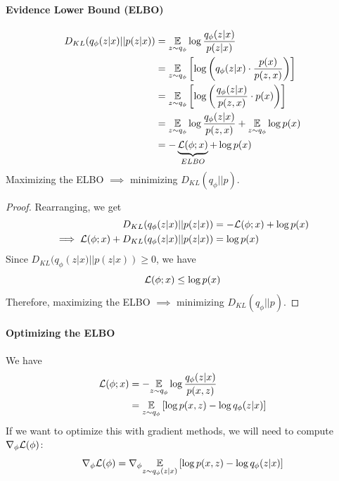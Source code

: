 \documentclass[11pt]{article}
\begin{document}
\paragraph{Evidence Lower Bound (ELBO)}
\begin{align*}
	D_{KL}(q_\phi(z|x)||p(z|x)) &= \underset{z \sim q_\phi}{\mathbb{E}} \log \frac{q_\phi(z|x)}{p(z|x)} \\
	&= \underset{z \sim q_\phi}{\mathbb{E}} \left[ \log \left( q_\phi(z|x) \cdot \frac{p(x)}{p(z,x)}\right) \right ] \\
	&= \underset{z \sim q_\phi}{\mathbb{E}} \left[ \log \left( \frac{q_\phi(z|x)}{p(z,x)}\cdot p(x) \right )\right ] \\
	&= \underset{z \sim q_\phi}{\mathbb{E}} \log \frac{q_\phi (z|x)}{p(z,x)} + \underset{z \sim q_\phi}{\mathbb{E}} \log p(x) \\
	&= - \underbrace{\mathcal{L}(\phi;x)}_{ELBO} + \log p(x)
\end{align*}
 Maximizing the ELBO $\implies$ minimizing $D_{KL}(q_\phi || p)$.
\begin{proof}
	Rearranging, we get
	\begin{align*}
		D_{KL}(q_\phi(z|x)||p(z|x)) &= -\mathcal{L}(\phi;x) + \log p(x) \\
		\implies \mathcal{L}(\phi;x) + D_{KL}(q_\phi(z|x)||p(z|x)) &= \log p(x)
	\end{align*}
	Since $D_{KL}(q_\phi(z|x)||p(z|x)) \geq 0$, we have
	$$\mathcal{L}(\phi;x) \leq \log p(x)$$
	Therefore, maximizing the ELBO $\implies$ minimizing $D_{KL}(q_\phi || p)$.
\end{proof} 
\paragraph{Optimizing the ELBO}
We have
\begin{align*}
	\mathcal{L}(\phi;x) &=  -\underset{z \sim q_\phi}{\mathbb{E}} \log \frac{q_\phi(z|x)}{p(x,z)}\\
	&= \underset{z \sim q_\phi}{\mathbb{E}}\left[ \log p(x,z) - \log q_\phi (z|x)\right]
\end{align*}
If we want to optimize this with gradient methods, we will need to compute $\nabla_\phi \mathcal{L}(\phi)$:
$$\nabla_\phi \mathcal{L}(\phi) = \nabla_\phi \underset{z \sim q_\phi(z|x)}{\mathbb{E}}\left[ \log p(x,z) - \log q_\phi (z|x)\right]$$
\end{document}
